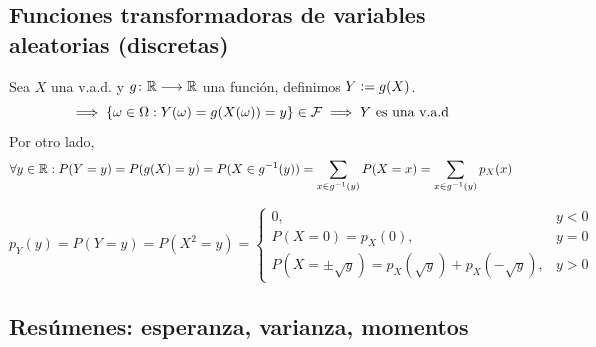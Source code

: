 \subsection{Funciones transformadoras de variables aleatorias (discretas)}
Sea $X$ una v.a.d. y $g \colon \mathbb{R} \longrightarrow \mathbb{R}$ una función, definimos $Y\vcentcolon= g(X)$.
\[\implies \{\omega \in\Omega:Y(\omega)=g(X(\omega))=y\} \in \mathcal{F} \implies Y\text{ es una v.a.d}\]
Por otro lado,
\[\forall y \in \mathbb{R}:P(Y=y)=P(g(X)=y)=P(X\in g^{-1}(y))=\sum_{x\in g^{-1}(y)}P(X=x)=\sum_{x\in g^{-1}(y)}p_X(x)\]

\begin{ejem}[$Y=x^2$]
	$$p_Y(y) = P(Y=y)=P(X^2=y)=\begin{cases}
			0,                                                                              & y <0 \\
			P(X=0)=p_X(0),                                                                  & y=0  \\
			P\left(X=\pm\sqrt{y}\right)=p_X\left(\sqrt{y}\right)+p_X\left(-\sqrt{y}\right), & y>0
		\end{cases}$$
\end{ejem}

\subsection{Resúmenes: esperanza, varianza, momentos}

